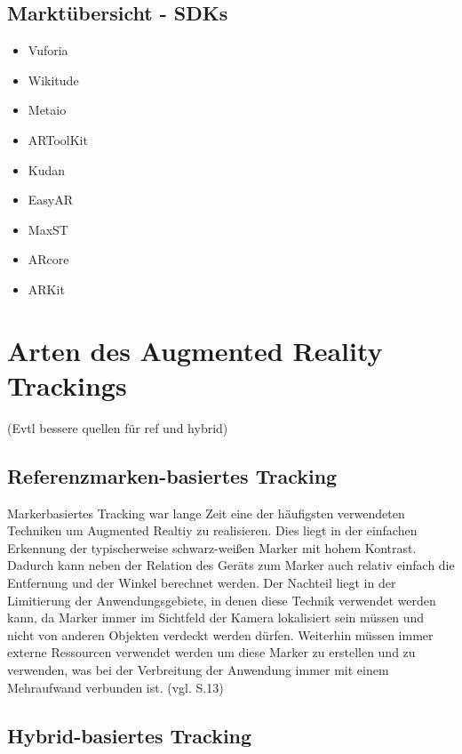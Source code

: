 \subsection{Marktübersicht - SDKs}

\begin{itemize}

\item Vuforia
\item Wikitude
\item Metaio
\item ARToolKit
\item Kudan
\item EasyAR
\item MaxST
\item ARcore
\item ARKit

\end{itemize}



\section{Arten des Augmented Reality Trackings}

(Evtl bessere quellen für ref und hybrid)

\subsection{Referenzmarken-basiertes Tracking}

Markerbasiertes Tracking war lange Zeit eine der häufigsten verwendeten Techniken um Augmented Realtiy zu realisieren. Dies liegt in der einfachen Erkennung der typischerweise schwarz-weißen Marker mit hohem Kontrast. Dadurch kann neben der Relation des Geräts zum Marker auch relativ einfach die Entfernung und der Winkel berechnet werden. Der Nachteil liegt in der Limitierung der Anwendungsgebiete, in denen diese Technik verwendet werden kann, da Marker immer im Sichtfeld der Kamera lokalisiert sein müssen und nicht von anderen Objekten verdeckt werden dürfen. Weiterhin müssen immer externe Ressourcen verwendet werden um diese Marker zu erstellen und zu verwenden, was bei der Verbreitung der Anwendung immer mit einem Mehraufwand verbunden ist. (vgl. \cite{comparative_sdks} S.13)

\subsection{Hybrid-basiertes Tracking}

